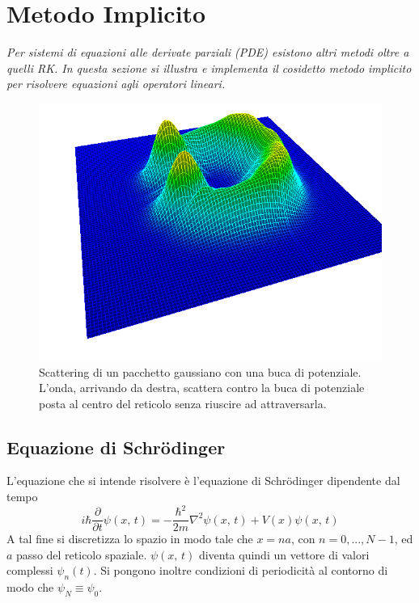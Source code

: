 \chapter{\huge Metodo Implicito}

\textit{Per sistemi di equazioni alle derivate parziali (PDE) esistono altri metodi oltre a quelli RK. In questa sezione si illustra e implementa il cosidetto metodo implicito per risolvere equazioni agli operatori lineari.}

\begin{figure}[H]
\centering
\includegraphics[width=\textwidth]{schrodinger}
\caption{Scattering di un pacchetto gaussiano con una buca di potenziale. L'onda, arrivando da destra, scattera contro la buca di potenziale posta al centro del reticolo senza riuscire ad attraversarla.}
\label{fig:schrodinger}
\end{figure}

\section{Equazione di Schr\"{o}dinger}

L'equazione che si intende risolvere è l'equazione di Schr\"odinger dipendente dal tempo
$$i\hbar\frac{\partial}{\partial t} \psi(x,\,t) = -\frac{\hbar^2}{2m}\nabla^2\psi(x,\,t) + V(x)\psi(x,\,t)$$
A tal fine si discretizza lo spazio in modo tale che $x=na$, con $n=0,...,N-1$, ed $a$ passo del reticolo spaziale. $\psi(x,\,t)$ diventa quindi un vettore di valori complessi $\psi_n(t)$. Si pongono inoltre condizioni di periodicità al contorno di modo che $\psi_N \equiv \psi_0$.


